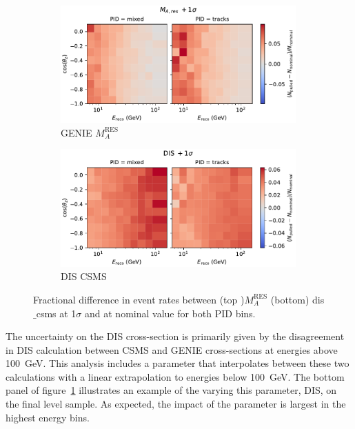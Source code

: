 \begin{figure}[!t] 
    \centering
    \begin{subfigure}[t]{0.7\textwidth}
        \centering
        \includegraphics[width=0.99\textwidth,trim={0 0 0 0.6cm},clip]{figures/measurement/systematics/xsec/Genie_Ma_RES.pdf}
        \caption{GENIE $M_{A}^\mathrm{RES}$}
    \end{subfigure}
    \begin{subfigure}[t]{0.7\textwidth}
        \centering
        \includegraphics[width=0.99\textwidth,trim={0 0 0 0.6cm},clip]{figures/measurement/systematics/xsec/dis_csms.pdf}
        \caption{DIS CSMS}
    \end{subfigure}  
  \caption{Fractional difference in event rates between (top )$M_{A}^\mathrm{RES}$ (bottom) dis$\_$csms at 1$\sigma$ and at nominal value for both PID bins.
  \label{fig:template_xsecsyst}}
\end{figure}

The uncertainty on the DIS cross-section is primarily given by the disagreement in DIS calculation between CSMS and GENIE cross-sections at energies above 100~GeV. This analysis includes a parameter that interpolates between these two calculations with a linear extrapolation to energies below 100~GeV.
The bottom panel of figure~\ref{fig:template_xsecsyst} illustrates an example of the varying this parameter, DIS, on the final level sample. As expected, the impact of the parameter is largest in the highest energy bins.

